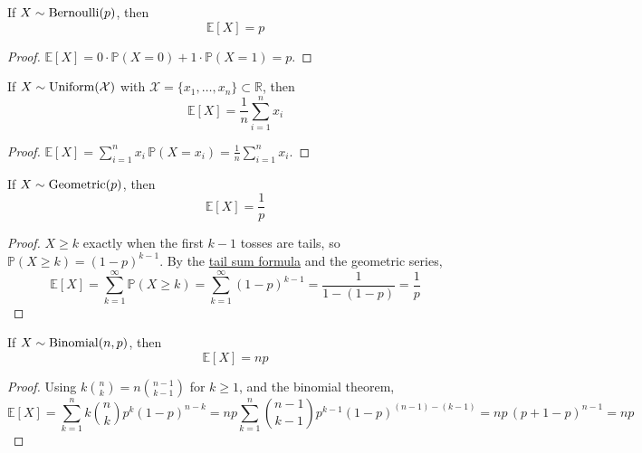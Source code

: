  \begin{theorem}
    \label{thm:expectation-of-bernoulli}
    If \hyperref[def:indicator-bernoulli-random-variable]{$X \sim \operatorname{Bernoulli}(p)$}, then 
    \begin{equation}
      \mathbb{E}[X] = p
    \end{equation}
  \end{theorem}
  \begin{proof}
    $\mathbb{E}[X] = 0 \cdot \mathbb{P}(X = 0) + 1 \cdot \mathbb{P}(X = 1) = p$. 
  \end{proof}

  \begin{theorem}
    \label{thm:expectation-of-discrete-uniform}
    If \hyperref[def:uniform-random-variable]{$X \sim \operatorname{Uniform}(\mathcal{X})$} with $\mathcal{X} = \{x_1, \ldots, x_n\} \subset \mathbb{R}$, then 
    \begin{equation}
      \mathbb{E}[X] = \frac{1}{n} \sum_{i=1}^n x_i
    \end{equation}
  \end{theorem}
  \begin{proof}
    $\mathbb{E}[X] = \sum_{i=1}^n x_i \, \mathbb{P}(X = x_i) = \frac{1}{n} \sum_{i=1}^n x_i$. 
  \end{proof}

  \begin{theorem}
    \label{thm:expectation-of-geometric}
    If \hyperref[def:geometric-random-variable]{$X \sim \operatorname{Geometric}(p)$}, then 
    \begin{equation}
      \mathbb{E}[X] = \frac{1}{p}
    \end{equation}
  \end{theorem}
  \begin{proof}
    $X \geq k$ exactly when the first $k - 1$ tosses are tails, so $\mathbb{P}(X \geq k) = (1 - p)^{k-1}$. By the \hyperref[thm:tail-sum-formula]{tail sum formula} and the geometric series, 
    \begin{equation}
      \mathbb{E}[X] = \sum_{k=1}^\infty \mathbb{P}(X \geq k) = \sum_{k=1}^\infty (1 - p)^{k-1} = \frac{1}{1 - (1 - p)} = \frac{1}{p}
    \end{equation}
  \end{proof}

  \begin{theorem}
    \label{thm:expectation-of-binomial}
    If \hyperref[def:binomial-random-variable]{$X \sim \operatorname{Binomial}(n, p)$}, then 
    \begin{equation}
      \mathbb{E}[X] = np
    \end{equation}
  \end{theorem}
  \begin{proof}
    Using $k \binom{n}{k} = n \binom{n-1}{k-1}$ for $k \geq 1$, and the binomial theorem, 
    \begin{equation}
      \mathbb{E}[X] = \sum_{k=1}^n k \binom{n}{k} p^k (1 - p)^{n-k} = np \sum_{k=1}^n \binom{n-1}{k-1} p^{k-1} (1 - p)^{(n-1) - (k-1)} = np \, (p + 1 - p)^{n-1} = np
    \end{equation}
  \end{proof}

